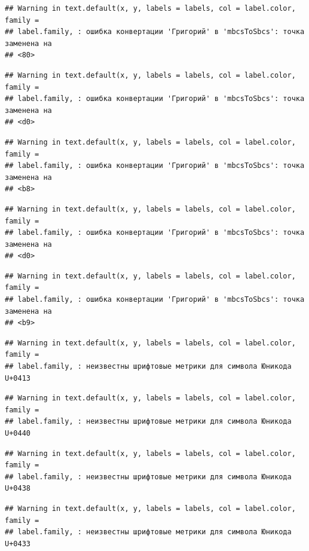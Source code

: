 \documentclass[]{book}
\begin{document}
\begin{verbatim}
## Warning in text.default(x, y, labels = labels, col = label.color, family =
## label.family, : ошибка конвертации 'Григорий' в 'mbcsToSbcs': точка заменена на
## <80>
\end{verbatim}

\begin{verbatim}
## Warning in text.default(x, y, labels = labels, col = label.color, family =
## label.family, : ошибка конвертации 'Григорий' в 'mbcsToSbcs': точка заменена на
## <d0>
\end{verbatim}

\begin{verbatim}
## Warning in text.default(x, y, labels = labels, col = label.color, family =
## label.family, : ошибка конвертации 'Григорий' в 'mbcsToSbcs': точка заменена на
## <b8>
\end{verbatim}

\begin{verbatim}
## Warning in text.default(x, y, labels = labels, col = label.color, family =
## label.family, : ошибка конвертации 'Григорий' в 'mbcsToSbcs': точка заменена на
## <d0>
\end{verbatim}

\begin{verbatim}
## Warning in text.default(x, y, labels = labels, col = label.color, family =
## label.family, : ошибка конвертации 'Григорий' в 'mbcsToSbcs': точка заменена на
## <b9>
\end{verbatim}

\begin{verbatim}
## Warning in text.default(x, y, labels = labels, col = label.color, family =
## label.family, : неизвестны шрифтовые метрики для символа Юникода U+0413
\end{verbatim}

\begin{verbatim}
## Warning in text.default(x, y, labels = labels, col = label.color, family =
## label.family, : неизвестны шрифтовые метрики для символа Юникода U+0440
\end{verbatim}

\begin{verbatim}
## Warning in text.default(x, y, labels = labels, col = label.color, family =
## label.family, : неизвестны шрифтовые метрики для символа Юникода U+0438
\end{verbatim}

\begin{verbatim}
## Warning in text.default(x, y, labels = labels, col = label.color, family =
## label.family, : неизвестны шрифтовые метрики для символа Юникода U+0433
\end{verbatim}
\end{document}
